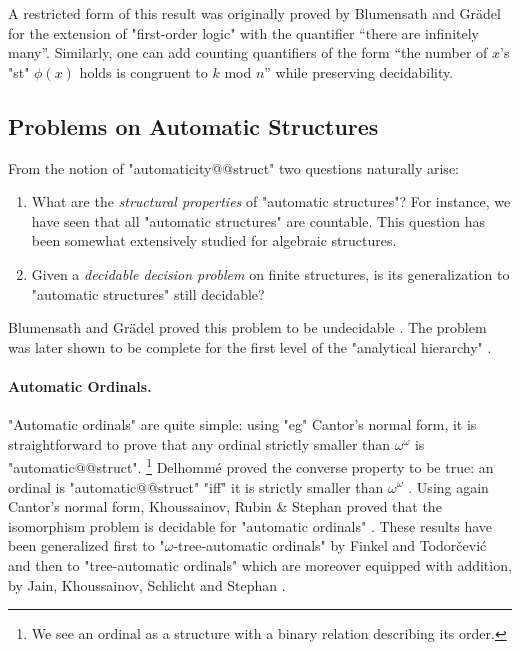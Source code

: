 A restricted form of this result was originally proved by Blumensath and Grädel
\cite[Corollary~5.4]{BlumensathGradel2004FinitePresentations} for the extension of
"first-order logic" with the quantifier ``there are infinitely many''.
Similarly, one can add counting quantifiers of the form ``the number of $x$'s "st" $\phi(x)$ holds
is congruent to $k$ mod $n$'' \cite[\S~3.2]{Rubin2008AutomataPresentingStructures}
while preserving decidability.

\subsection{Problems on Automatic Structures}

From the notion of "automaticity@@struct" two questions naturally arise:
\begin{enumerate}
	\item What are the \emph{structural properties} of "automatic structures"?
		For instance, we have seen that all "automatic structures" are countable.
		This question has been somewhat extensively studied for algebraic structures.
	\item Given a \emph{decidable decision problem} on finite structures, is its generalization
		to "automatic structures" still decidable?
\end{enumerate}

Blumensath and Grädel proved this problem
to be undecidable \cite[Theorem~5.15]{BlumensathGradel2004FinitePresentations}.
The problem was later shown to be complete for the first level
of the "analytical hierarchy" \cite[Theorem~5.9]{KhoussainovNiesRubinStephan2007Automatic}.

\paragraph*{Automatic Ordinals.}
"Automatic ordinals" are quite simple: using "eg" Cantor's normal form, it is straightforward
to prove that any ordinal strictly smaller than $\omega^\omega$ is "automatic@@struct".%
\footnote{We see an ordinal as a structure with a binary relation describing its order.}
Delhommé proved the converse property to be true:
an ordinal is "automatic@@struct" "iff" it is strictly smaller than $\omega^\omega$
\cite[Corollaire~2.2]{Delhommé2004AutomaticitéOrdinaux}.
Using again Cantor's normal form,
Khoussainov, Rubin \& Stephan proved that the isomorphism problem is decidable for
"automatic ordinals" \cite[Theorem~5.3]{KhoussainovRubinStephan2005AutomaticLinearOrders}.
These results have been generalized first to "$\omega$-tree-automatic ordinals"
by Finkel and Todor\v{c}ević \cite{FinkelTodorcevic2013AutomaticOrdinals}
and then to "tree-automatic ordinals" which
are moreover equipped with addition, by Jain, Khoussainov, Schlicht and Stephan
\cite{JainKhoussainovSchlichtStephan2019IsomorphismTreeAutomaticOrdinals}.

